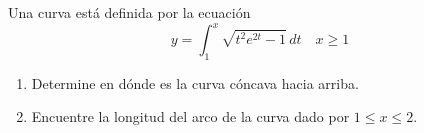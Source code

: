 \item Una curva está definida por la ecuación
    \[ y = \int_1^x \sqrt{t^2 e^{2t} - 1} \, dt \quad x \ge 1 \]
    \begin{enumerate}
        \item[(a)] Determine en dónde es la curva cóncava hacia arriba.
        \item[(b)] Encuentre la longitud del arco de la curva dado por $1 \le x \le 2$.
    \end{enumerate}
